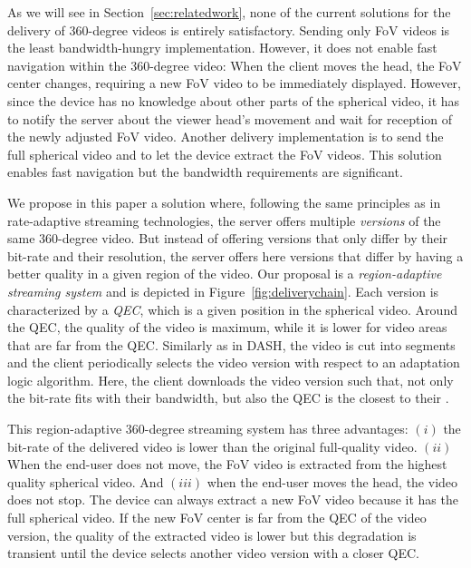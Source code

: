 As we will see in Section~\ref{sec:relatedwork}, none of the current solutions 
for the delivery of 360-degree videos is entirely
satisfactory. Sending only FoV videos is the least bandwidth-hungry 
implementation. However, it does
not enable fast
navigation within the 360-degree video: When the client moves the head, the FoV 
center changes, requiring a new FoV video to be immediately displayed. However, since 
the device has no knowledge about other parts of the spherical video, it has to notify 
the server about the viewer head's movement and wait for reception of the newly 
adjusted FoV video.
Another delivery implementation is to send the full spherical video
and to let the device
extract the \ac{FoV} videos. This solution enables fast navigation but the bandwidth 
requirements are
significant.

We propose in this paper a solution where, following the same principles as in
rate-adaptive streaming technologies, the server offers multiple \emph{versions} of the same
360-degree video. But instead of offering versions that only differ by
their bit-rate and their resolution, the server offers here versions that differ by 
having a better quality in a given region of the video.
Our proposal is a \emph{region-adaptive streaming system} and is depicted in 
Figure~\ref{fig:deliverychain}.
Each version is characterized by a \emph{\ac{QEC}}, which is a given
position in the spherical video. Around the \ac{QEC}, the quality of the video is maximum,
while it is lower for video areas that are far from the \ac{QEC}. Similarly as 
in \ac{DASH}, the video is cut into segments and the client periodically selects
the video version with respect to an adaptation logic algorithm. Here, the client downloads 
the video version
such that, not only the bit-rate fits with their bandwidth, but also
the \ac{QEC} is the closest to their .



This region-adaptive 360-degree streaming system has three advantages:
$(i)$ the bit-rate of the delivered video is lower than the original full-quality video.
$(ii)$ When the end-user does not move, the \ac{FoV} video is extracted from the highest
quality spherical video.
And $(iii)$ when the end-user moves the head, the video does not stop. The device can
always extract
a new \ac{FoV} video because it has the full spherical video. If the 
new \ac{FoV} center is far from the
\ac{QEC} of the video version, the quality of the extracted video is lower but this
degradation is transient until the
device selects another video version with a closer \ac{QEC}.

